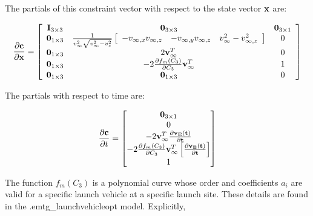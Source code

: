The partials of this constraint vector with respect to the state vector $\bold{x}$ are:

\begin{equation}
\frac{\partial \mathbf{c}}{\partial \mathbf{x}} =
\left[ \begin{array}{ccc}
\mathbf{I}_{3 \times 3} & \bold{0}_{3 \times 3} & \bold{0}_{3 \times 1} \\
\bold{0}_{1 \times 3} & \frac{1}{v_{\infty}^2\sqrt{v_\infty^2-v_z^2}}\left[ \begin{array}{ccc} -v_{\infty,x}v_{\infty,z} & -v_{\infty,y}v_{\infty,z}  & v_\infty^2-v_{\infty,z}^2 \end{array} \right] & 0 \\
\bold{0}_{1 \times 3} & 2 \bold{v}_{\infty}^T & 0 \\
\bold{0}_{1 \times 3} & -2 \frac{\partial f_m \left(C_3 \right)}{\partial C_3} \bold{v}_{\infty}^T & 1 \\
\bold{0}_{1 \times 3} & \bold{0}_{1 \times 3} & 0
\end{array} \right]
\end{equation}

The partials with respect to time are:

\begin{equation}
\frac{\partial \mathbf{c}}{\partial t} =
\begin{bmatrix}
\bold{0}_{3 \times 1}\\
0\\
-2 \mathbf{v}_{\infty}^T \frac{\partial \mathbf{v_E(t)}}{\partial \mathbf{t}}\\
-2\frac{\partial f_m \left( C_3 \right)}{\partial C_3} \mathbf{v}_{\infty}^T\left[\frac{\partial \mathbf{v_E(t)}}{\partial \mathbf{t}} \right] \\
1\\
\end{bmatrix}
\end{equation}

The function $f_m(C_3)$ is a polynomial curve whose order and coefficients $a_i$ are valid for a specific launch vehicle at a specific launch site. These details are found in the .emtg\_launchvehicleopt model. Explicitly,

